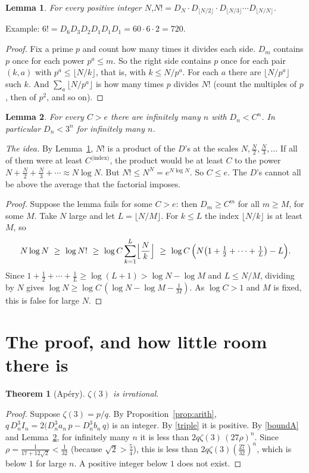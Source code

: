 \documentclass[11pt]{article}
\newtheorem{theorem}{Theorem}
\newtheorem{lemma}{Lemma}
\theoremstyle{remark}
\begin{document}
\begin{lemma}\label{lem:fact}
For every positive integer $N$,\quad $N!=D_N\cdot D_{\lfloor N/2\rfloor}\cdot D_{\lfloor N/3\rfloor}
\cdots D_{\lfloor N/N\rfloor}$.
\end{lemma}
\noindent Example: $6!=D_6D_3D_2D_1D_1D_1=60\cdot6\cdot2=720$.
\begin{proof}
Fix a prime $p$ and count how many times it divides each side. $D_m$ contains $p$ once for each
power $p^a\le m$. So the right side contains $p$ once for each pair $(k,a)$ with
$p^a\le\lfloor N/k\rfloor$, that is, with $k\le N/p^a$. For each $a$ there are $\lfloor N/p^a\rfloor$
such $k$. And $\sum_a\lfloor N/p^a\rfloor$ is how many times $p$ divides $N!$ (count the multiples of
$p$, then of $p^2$, and so on).
\end{proof}

\begin{lemma}\label{lem:lcm}
For every $C>e$ there are infinitely many $n$ with $D_n<C^n$. In particular $D_n<3^n$ for
infinitely many $n$.
\end{lemma}
\noindent\emph{The idea.} By Lemma~\ref{lem:fact}, $N!$ is a product of the $D$'s at the scales
$N,\frac N2,\frac N3,\dots$ If all of them were at least $C^{\text{(index)}}$, the product would be
at least $C$ to the power $N+\frac N2+\frac N3+\cdots\approx N\log N$. But $N!\le N^N=e^{N\log N}$. So
$C\le e$. The $D$'s cannot all be above the average that the factorial imposes.
\begin{proof}
Suppose the lemma fails for some $C>e$: then $D_m\ge C^m$ for all $m\ge M$, for some $M$. Take $N$
large and let $L=\lfloor N/M\rfloor$. For $k\le L$ the index $\lfloor N/k\rfloor$ is at least $M$, so
\[
N\log N\ \ge\ \log N!\ \ge\ \log C\sum_{k=1}^{L}\Bigl\lfloor\frac Nk\Bigr\rfloor
\ \ge\ \log C\,\Bigl(N\bigl(1+\tfrac12+\cdots+\tfrac1L\bigr)-L\Bigr).
\]
Since $1+\frac12+\cdots+\frac1L\ge\log(L+1)>\log N-\log M$ and $L\le N/M$, dividing by $N$ gives
$\log N\ge\log C\,(\log N-\log M-\frac1M)$. As $\log C>1$ and $M$ is fixed, this is false for large
$N$.
\end{proof}

\section{The proof, and how little room there is}

\begin{theorem}[Ap\'ery]
$\zeta(3)$ is irrational.
\end{theorem}
\begin{proof}
Suppose $\zeta(3)=p/q$. By Proposition~\ref{prop:arith},
$q\,D_n^3I_n=2\bigl(D_n^3a_n\,p-D_n^3b_n\,q\bigr)$ is an integer. By \eqref{triple} it is positive.
By \eqref{boundA} and Lemma~\ref{lem:lcm}, for infinitely many $n$ it is less than
$2q\zeta(3)\,(27\rho)^n$. Since $\rho=\frac1{17+12\sqrt2}<\frac1{32}$ (because $\sqrt2>\frac54$),
this is less than $2q\zeta(3)(\frac{27}{32})^n$, which is below $1$ for large $n$. A positive
integer below $1$ does not exist.
\end{proof}
\end{document}
